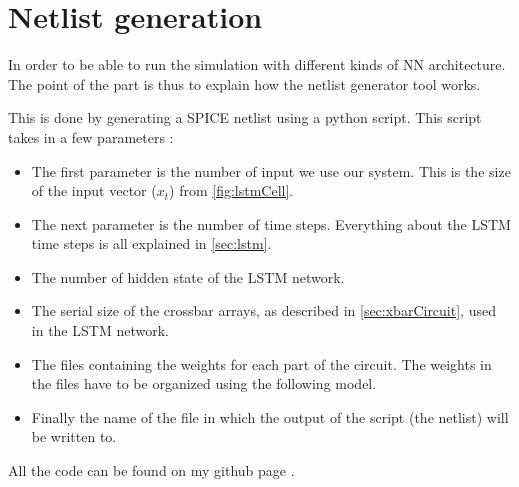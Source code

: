 \section{Netlist generation}
\label{sec:netlist}

In order to be able to run the simulation with different kinds of \ac{NN} architecture. The point of the part is thus to explain how the netlist generator tool works.

This is done by generating a SPICE netlist using a python script. This script takes in a few parameters :

\begin{itemize}
  \item The first parameter is the number of input we use our system. This is the size of the input vector ($x_t$) from \cref{fig:lstmCell}.
  \item The next parameter is the number of time steps. Everything about the \ac{LSTM} time steps is all explained in \cref{sec:lstm}.
  \item The number of hidden state of the \ac{LSTM} network.
  \item The serial size of the crossbar arrays, as described in \cref{sec:xbarCircuit}, used in the \ac{LSTM} network.
  \item The files containing the weights for each part of the circuit. The weights in the files have to be organized using the following model. %
  \item Finally the name of the file in which the output of the script (the netlist) will be written to.
\end{itemize}


All the code can be found on my github page \cite{lstmGen}.
